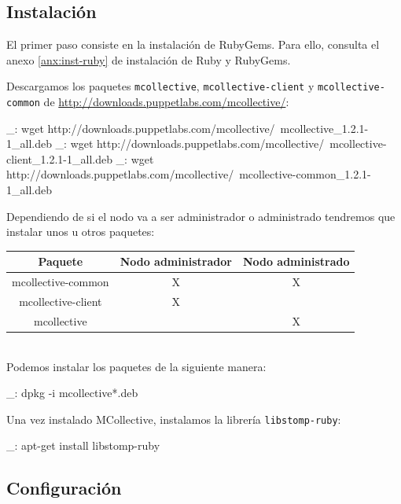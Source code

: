 \subsection{Instalación}

El primer paso consiste en la instalación de RubyGems. Para ello, consulta el anexo \ref{anx:inst-ruby} de instalación de Ruby y RubyGems.

Descargamos los paquetes \texttt{mcollective}, \texttt{mcollective-client} y \texttt{mcollective-common} de \url{http://downloads.puppetlabs.com/mcollective/}:

\begin{bashcode}
_: wget http://downloads.puppetlabs.com/mcollective/\
mcollective_1.2.1-1_all.deb
_: wget http://downloads.puppetlabs.com/mcollective/\
mcollective-client_1.2.1-1_all.deb
_: wget http://downloads.puppetlabs.com/mcollective/\
mcollective-common_1.2.1-1_all.deb
\end{bashcode}

Dependiendo de si el nodo va a ser administrador o administrado tendremos que instalar unos u otros paquetes:

\begin{tabular}{|c|c|c|}
   \hline
   Paquete & Nodo administrador & Nodo administrado \\ \hline
   mcollective-common & X & X \\ \hline
   mcollective-client & X &   \\ \hline
   mcollective &  & X \\ \hline
\end{tabular}
\\

Podemos instalar los paquetes de la siguiente manera:

\begin{bashcode}
_: dpkg -i mcollective*.deb
\end{bashcode}

Una vez instalado MCollective, instalamos la librería \texttt{libstomp-ruby}:

\begin{bashcode}
_: apt-get install libstomp-ruby
\end{bashcode}


\subsection{Configuración}

